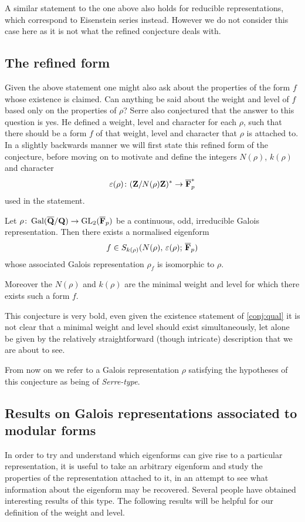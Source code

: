 \documentclass[a4paper,12pt]{article}
\begin{document}
A similar statement to the one above also holds for reducible representations, which correspond to Eisenstein series instead.
However we do not consider this case here as it is not what the refined conjecture deals with.


\subsection{The refined form}
Given the above statement one might also ask about the properties of the form $f$ whose existence is claimed.
Can anything be said about the weight and level of $f$ based only on the properties of $\rho$?
Serre also conjectured that the answer to this question is yes.
He defined a weight, level and character for each $\rho$, such that there should be a form $f$ of that weight, level and character that $\rho$ is attached to.
In a slightly backwards manner we will first state this refined form of the conjecture, before moving on to motivate and define the integers $N(\rho)$, $k(\rho)$ and character
\[
\varepsilon(\rho)\colon (\mathbf{Z}/N(\rho)\mathbf{Z})^* \to \overline{\mathbf{F}}_p^*
\]
used in the statement.

\begin{conjecture}\label{conj:ref}
Let $\rho\colon \operatorname{Gal}(\overline{\mathbf{Q}}/\mathbf{Q}) \to \operatorname{GL}_2(\overline{\mathbf{F}}_p)$ be a continuous, odd, irreducible Galois representation.
Then there exists a normalised eigenform
\[
f\in S_{k(\rho)}(N(\rho),\,\varepsilon(\rho);\,\overline{\mathbf{F}}_p)
\]
whose associated Galois representation $\rho_f$ is isomorphic to $\rho$.

Moreover the $N(\rho)$ and $k(\rho)$ are the minimal weight and level for which there exists such a form $f$.
\end{conjecture}

This conjecture is very bold, even given the existence statement of \cref{conj:qual} it is not clear that a minimal weight and level should exist simultaneously, let alone be given by the relatively straightforward (though intricate) description that we are about to see.

From now on we refer to a Galois representation $\rho$ satisfying the hypotheses of this conjecture as being of \emph{Serre-type}.


\subsection{Results on Galois representations associated to modular forms}\label{sec:galassoc}
In order to try and understand which eigenforms can give rise to a particular representation, it is useful to take an arbitrary eigenform and study the properties of the representation attached to it, in an attempt to see what information about the eigenform may be recovered.
Several people have obtained interesting results of this type.
The following results will be helpful for our definition of the weight and level.
\end{document}

